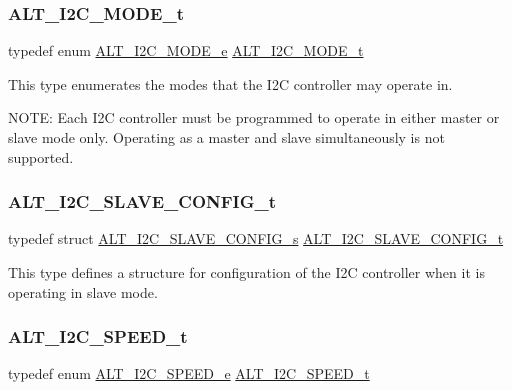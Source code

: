 \subsubsection{\texorpdfstring{ALT\_I2C\_MODE\_t}{ALT\_I2C\_MODE\_t}}
{\footnotesize\ttfamily typedef enum \mbox{\hyperlink{group__ALT__I2C_gacf173458ee847bebf75871c319aab2af}{A\+L\+T\+\_\+\+I2\+C\+\_\+\+M\+O\+D\+E\+\_\+e}}  \mbox{\hyperlink{group__ALT__I2C_ga15e9cb79693e43e74075112b2aebe1e2}{A\+L\+T\+\_\+\+I2\+C\+\_\+\+M\+O\+D\+E\+\_\+t}}}

This type enumerates the modes that the I2C controller may operate in.

N\+O\+TE\+: Each I2C controller must be programmed to operate in either master or slave mode only. Operating as a master and slave simultaneously is not supported. \mbox{\label{group__ALT__I2C_ga9c0d22378cb1d6eb0194ca424026081d}} 
\subsubsection{\texorpdfstring{ALT\_I2C\_SLAVE\_CONFIG\_t}{ALT\_I2C\_SLAVE\_CONFIG\_t}}
{\footnotesize\ttfamily typedef struct \mbox{\hyperlink{structALT__I2C__SLAVE__CONFIG__s}{A\+L\+T\+\_\+\+I2\+C\+\_\+\+S\+L\+A\+V\+E\+\_\+\+C\+O\+N\+F\+I\+G\+\_\+s}}  \mbox{\hyperlink{group__ALT__I2C_ga9c0d22378cb1d6eb0194ca424026081d}{A\+L\+T\+\_\+\+I2\+C\+\_\+\+S\+L\+A\+V\+E\+\_\+\+C\+O\+N\+F\+I\+G\+\_\+t}}}

This type defines a structure for configuration of the I2C controller when it is operating in slave mode. \mbox{\label{group__ALT__I2C_ga1601b0e27fb2a82170d10b4f6bdedbf6}} 
\subsubsection{\texorpdfstring{ALT\_I2C\_SPEED\_t}{ALT\_I2C\_SPEED\_t}}
{\footnotesize\ttfamily typedef enum \mbox{\hyperlink{group__ALT__I2C_gad65b1b276561735ec5613ae1b1a000b7}{A\+L\+T\+\_\+\+I2\+C\+\_\+\+S\+P\+E\+E\+D\+\_\+e}}  \mbox{\hyperlink{group__ALT__I2C_ga1601b0e27fb2a82170d10b4f6bdedbf6}{A\+L\+T\+\_\+\+I2\+C\+\_\+\+S\+P\+E\+E\+D\+\_\+t}}}

